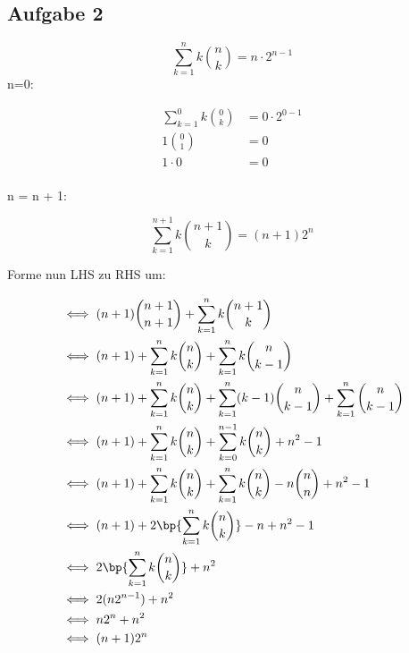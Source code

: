 \subsection*{Aufgabe 2}

\[ \sum_{k=1}^{n} k\binom{n}{k} = n \cdot 2^{n-1} \]
n=0:

\begin{align*}
\sum_{k=1}^{0} k\binom{0}{k} &= 0 \cdot 2^{0-1}  \\
1\binom{0}{1} &= 0 \\
1 \cdot 0 &= 0  \\
\end{align*}

n = n + 1:

\[ \sum_{k=1}^{n+1} k\binom{n+1}{k} = (n+1)2^{n}  \]

Forme nun LHS zu RHS um:

\begin{align*}
& \iff (n+1)\binom{n+1}{n+1} + \sum_{k=1}^{n}k\binom{n+1}{k} \\
& \iff (n+1) + \sum_{k=1}^{n}k\binom{n}{k} + \sum_{k=1}^{n}k\binom{n}{k-1} \\
& \iff (n+1) + \sum_{k=1}^{n}k\binom{n}{k} + \sum_{k=1}^{n}(k-1)\binom{n}{k-1} + \sum_{k=1}^{n}\binom{n}{k-1} \\
& \iff (n+1) + \sum_{k=1}^{n}k\binom{n}{k} + \sum_{k=0}^{n-1}k\binom{n}{k} + n^{2} - 1 \\
& \iff (n+1) + \sum_{k=1}^{n}k\binom{n}{k} + \sum_{k=1}^{n}k\binom{n}{k} - n\binom{n}{n} + n^{2} - 1 \\
& \iff (n+1) + 2\bp{\sum_{k=1}^{n}k\binom{n}{k}} - n + n^{2} - 1 \\
& \iff 2\bp{\sum_{k=1}^{n}k\binom{n}{k}} + n^{2} \\
& \iff 2(n2^{n-1}) + n^{2} \\
& \iff n2^{n} + n^{2} \\
& \iff (n+1)2^{n} \\
\end{align*}



